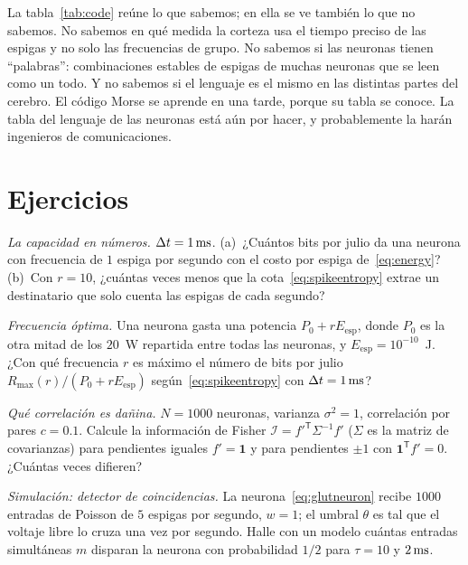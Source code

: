 La tabla~\ref{tab:code} reúne lo que sabemos; en ella se ve también lo que no sabemos. No sabemos en qué medida la corteza usa el tiempo preciso de las espigas y no solo las frecuencias de grupo. No sabemos si las neuronas tienen “palabras”: combinaciones estables de espigas de muchas neuronas que se leen como un todo. Y no sabemos si el lenguaje es el mismo en las distintas partes del cerebro. El código Morse se aprende en una tarde, porque su tabla se conoce. La tabla del lenguaje de las neuronas está aún por hacer, y probablemente la harán ingenieros de comunicaciones.

\section{Ejercicios}

\begin{exercise}[\lvlA]
\label{ex:04:1}
\emph{La capacidad en números.} $\Delta t=1\,\text{ms}$. (a)~¿Cuántos bits por julio da una neurona con frecuencia de $1$ espiga por segundo con el costo por espiga de~\eqref{eq:energy}? (b)~Con $r=10$, ¿cuántas veces menos que la cota~\eqref{eq:spikeentropy} extrae un destinatario que solo cuenta las espigas de cada segundo?
\end{exercise}

\begin{exercise}[\lvlB]
\label{ex:04:2}
\emph{Frecuencia óptima.} Una neurona gasta una potencia $P_0+rE_{\text{esp}}$, donde $P_0$ es la otra mitad de los $20$~W repartida entre todas las neuronas, y $E_{\text{esp}}=10^{-10}$~J. ¿Con qué frecuencia $r$ es máximo el número de bits por julio $R_{\max}(r)/(P_0+rE_{\text{esp}})$ según~\eqref{eq:spikeentropy} con $\Delta t=1\,\text{ms}$?
\end{exercise}

\begin{exercise}[\lvlB]
\label{ex:04:3}
\emph{Qué correlación es dañina.} $N=1000$ neuronas, varianza $\sigma^2=1$, correlación por pares $c=0.1$. Calcule la información de Fisher $\mathcal I=f'^{\mathsf T}\Sigma^{-1}f'$ ($\Sigma$ es la matriz de covarianzas) para pendientes iguales $f'=\mathbf 1$ y para pendientes $\pm1$ con $\mathbf 1^{\mathsf T}f'=0$. ¿Cuántas veces difieren?
\end{exercise}

\begin{exercise}[\lvlB]
\label{ex:04:4}
\emph{Simulación: detector de coincidencias.} La neurona~\eqref{eq:glutneuron} recibe $1000$ entradas de Poisson de $5$ espigas por segundo, $w=1$; el umbral $\theta$ es tal que el voltaje libre lo cruza una vez por segundo. Halle con un modelo cuántas entradas simultáneas $m$ disparan la neurona con probabilidad $1/2$ para $\tau=10$ y $2\,\text{ms}$.
\end{exercise}

